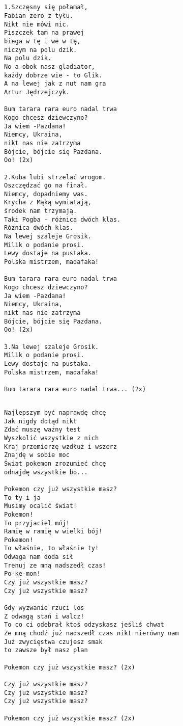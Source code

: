 \documentclass[12pt]{article}
\begin{document}
\subsection*{}
\begin{verbatim}
1.Szczęsny się połamał,
Fabian zero z tyłu.
Nikt nie mówi nic.
Piszczek tam na prawej
biega w tę i we w tę,
niczym na polu dzik.
Na polu dzik.
No a obok nasz gladiator,
każdy dobrze wie - to Glik.
A na lewej jak z nut nam gra
Artur Jędrzejczyk.

Bum tarara rara euro nadal trwa
Kogo chcesz dziewczyno?
Ja wiem -Pazdana!
Niemcy, Ukraina,
nikt nas nie zatrzyma
Bójcie, bójcie się Pazdana.
Oo! (2x)

2.Kuba lubi strzelać wrogom.
Oszczędzać go na finał.
Niemcy, dopadniemy was.
Krycha z Mąką wymiatają,
środek nam trzymają.
Taki Pogba - różnica dwóch klas.
Różnica dwóch klas.
Na lewej szaleje Grosik.
Milik o podanie prosi.
Lewy dostaje na pustaka.
Polska mistrzem, madafaka!

Bum tarara rara euro nadal trwa
Kogo chcesz dziewczyno?
Ja wiem -Pazdana!
Niemcy, Ukraina,
nikt nas nie zatrzyma
Bójcie, bójcie się Pazdana.
Oo! (2x)

3.Na lewej szaleje Grosik.
Milik o podanie prosi.
Lewy dostaje na pustaka.
Polska mistrzem, madafaka!

Bum tarara rara euro nadal trwa... (2x)
\end{verbatim}
\clearpage

\subsection*{}
\begin{verbatim}
Najlepszym być naprawdę chcę
Jak nigdy dotąd nikt
Zdać muszę ważny test
Wyszkolić wszystkie z nich
Kraj przemierzę wzdłuż i wszerz
Znajdę w sobie moc
Świat pokemon zrozumieć chcę
odnajdę wszystkie bo...

Pokemon czy już wszystkie masz?
To ty i ja
Musimy ocalić świat!
Pokemon!
To przyjaciel mój!
Ramię w ramię w wielki bój!
Pokemon!
To właśnie, to właśnie ty!
Odwaga nam doda sił
Trenuj ze mną nadszedł czas!
Po-ke-mon!
Czy już wszystkie masz?
Czy już wszystkie masz?

Gdy wyzwanie rzuci los
Z odwagą stań i walcz!
To co ci odebrał ktoś odzyskasz jeśliś chwat
Ze mną chodź już nadszedł czas nikt nierówny nam
Już zwycięstwa czujesz smak
to zawsze był nasz plan

Pokemon czy już wszystkie masz? (2x)

Czy już wszystkie masz?
Czy już wszystkie masz?
Czy już wszystkie masz?

Pokemon czy już wszystkie masz? (2x)
\end{verbatim}
\clearpage
\end{document}
